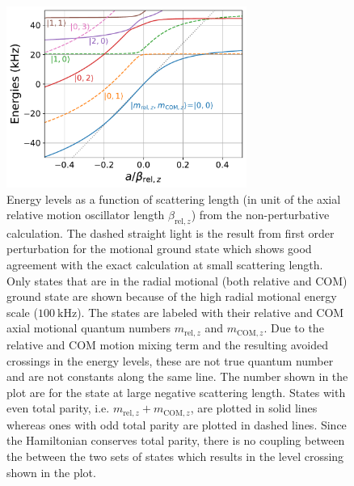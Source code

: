 \begin{figure}
  \centering
  \includegraphics[width=0.7\textwidth]{figures/interaction_shift_energies.pdf}
  \caption[Result of interaction shift calculation.]{
    Energy levels as a function of scattering length
    (in unit of the axial relative motion oscillator length
    $\beta_{\mathrm{rel},z}$) from the non-perturbative calculation.
    The dashed straight light is the result from first order perturbation
    for the motional ground state which shows good agreement with the exact calculation
    at small scattering length.
    Only states that are in the radial motional (both relative and COM) ground state
    are shown because of the high radial motional energy scale ($100~\mathrm{kHz}$).
    The states are labeled with their relative and COM axial motional quantum numbers
    $m_{\mathrm{rel},z}$ and $m_{\mathrm{COM},z}$.
    Due to the relative and COM motion mixing term and the resulting avoided crossings
    in the energy levels, these are not true quantum number
    and are not constants along the same line.
    The number shown in the plot are for the state at large negative scattering length.
    States with even total parity, i.e. $m_{\mathrm{rel},z} + m_{\mathrm{COM},z}$, are plotted in solid lines
    whereas ones with odd total parity are plotted in dashed lines.
    Since the Hamiltonian conserves total parity,
    there is no coupling between the between the two sets of states
    which results in the level crossing shown in the plot.
    \label{fig:interaction-shift:energies}}
\end{figure}

